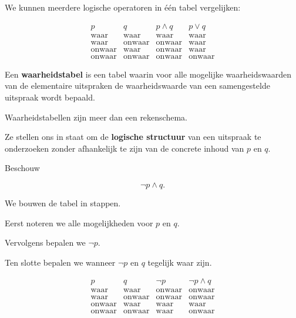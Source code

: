 \documentclass{ximera}
\begin{document}
  We kunnen meerdere logische operatoren in één tabel vergelijken:

  \[
  \begin{array}{c|c|c|c}
  p & q & p\land q & p\lor q\\
  \hline
  \text{waar} & \text{waar} & \text{waar} & \text{waar}\\
  \text{waar} & \text{onwaar} & \text{onwaar} & \text{waar}\\
  \text{onwaar} & \text{waar} & \text{onwaar} & \text{waar}\\
  \text{onwaar} & \text{onwaar} & \text{onwaar} & \text{onwaar}
  \end{array}
  \]


  \begin{definitie}
  Een \textbf{waarheidstabel} is een tabel waarin voor alle mogelijke
  waarheidswaarden van de elementaire uitspraken de waarheidswaarde van
  een samengestelde uitspraak wordt bepaald.
  \end{definitie}


  Waarheidstabellen zijn meer dan een rekenschema.

  Ze stellen ons in staat om de \textbf{logische structuur} van een
  uitspraak te onderzoeken zonder afhankelijk te zijn van de concrete
  inhoud van $p$ en $q$.



  Beschouw

  \[
  \neg p\land q.
  \]

  We bouwen de tabel in stappen.

  Eerst noteren we alle mogelijkheden voor $p$ en $q$.

  Vervolgens bepalen we $\neg p$.

  Ten slotte bepalen we wanneer $\neg p$ en $q$ tegelijk waar zijn.

  \[
  \begin{array}{c|c|c|c}
  p & q & \neg p & \neg p\land q\\
  \hline
  \text{waar} & \text{waar}
  & \text{onwaar} & \text{onwaar}\\

  \text{waar} & \text{onwaar}
  & \text{onwaar} & \text{onwaar}\\

  \text{onwaar} & \text{waar}
  & \text{waar} & \text{waar}\\

  \text{onwaar} & \text{onwaar}
  & \text{waar} & \text{onwaar}
  \end{array}
  \]
\end{document}
